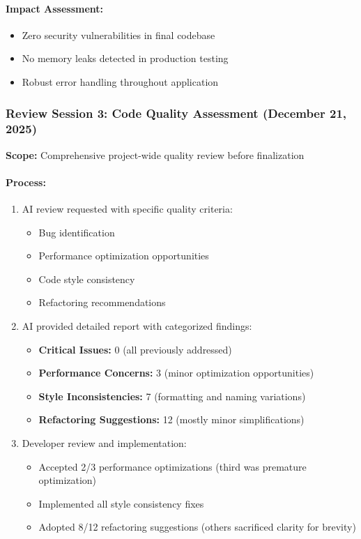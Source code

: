 \documentclass[12pt,a4paper]{article}
\begin{document}
\paragraph{Impact Assessment:}
\begin{itemize}
    \item Zero security vulnerabilities in final codebase
    \item No memory leaks detected in production testing
    \item Robust error handling throughout application
\end{itemize}

\subsubsection{Review Session 3: Code Quality Assessment (December 21, 2025)}

\textbf{Scope:} Comprehensive project-wide quality review before finalization

\paragraph{Process:}
\begin{enumerate}
    \item AI review requested with specific quality criteria:
    \begin{itemize}
        \item Bug identification
        \item Performance optimization opportunities
        \item Code style consistency
        \item Refactoring recommendations
    \end{itemize}
    
    \item AI provided detailed report with categorized findings:
    \begin{itemize}
        \item \textbf{Critical Issues:} 0 (all previously addressed)
        \item \textbf{Performance Concerns:} 3 (minor optimization opportunities)
        \item \textbf{Style Inconsistencies:} 7 (formatting and naming variations)
        \item \textbf{Refactoring Suggestions:} 12 (mostly minor simplifications)
    \end{itemize}
    
    \item Developer review and implementation:
    \begin{itemize}
        \item Accepted 2/3 performance optimizations (third was premature optimization)
        \item Implemented all style consistency fixes
        \item Adopted 8/12 refactoring suggestions (others sacrificed clarity for brevity)
    \end{itemize}
\end{enumerate}
\end{document}
